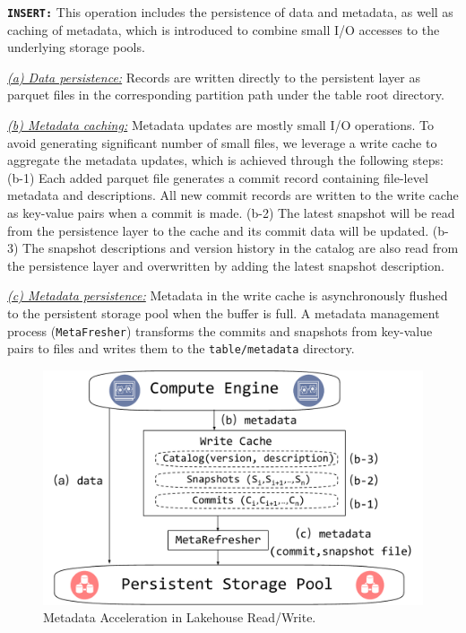 \noindent \textbf{\texttt{INSERT:}} This operation includes the persistence of data and metadata, as well as caching of metadata, which is introduced to combine small I/O accesses to the underlying storage pools.

\noindent \underline{\textit{(a) Data persistence:}} Records are written directly to the persistent layer as parquet files in the corresponding partition path under the table root directory.



\noindent \underline{\textit{(b) Metadata caching:}} Metadata updates are mostly small I/O operations. 
To avoid generating significant number of small files, we leverage a  write cache to aggregate the metadata updates, which is achieved through the following steps:
(b-1) Each added parquet file generates a commit record containing file-level metadata and descriptions. All new commit records are written to the write cache as key-value pairs when a commit is made.
(b-2) The latest snapshot will be read from the persistence layer to the cache and its commit data will be updated.
(b-3) The snapshot descriptions and version history in the catalog are also read from the persistence layer and  overwritten by adding the latest snapshot description. 

\noindent \underline{\textit{(c) Metadata persistence:}} Metadata in the  write cache is asynchronously flushed to the persistent storage pool when the buffer is full. A metadata management process (\texttt{MetaFresher}) transforms the commits and snapshots from key-value pairs to files and writes them to the \texttt{table/metadata} directory.

\begin{figure}[htbp]
	\includegraphics[scale=0.3]{figures/cache}
	\centering
	\vspace{-1em}
	\caption{Metadata Acceleration in Lakehouse Read/Write.}
	\label{fig:cache}
	\vspace{-1em}
\end{figure}


